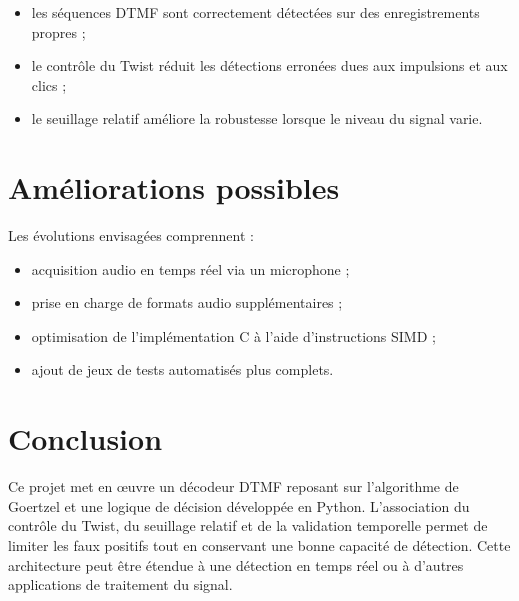 \documentclass[12pt,a4paper]{article}
\begin{document}
\begin{itemize}

\item les séquences DTMF sont correctement détectées sur des enregistrements propres ;

\item le contrôle du Twist réduit les détections erronées dues aux impulsions et aux clics ;

\item le seuillage relatif améliore la robustesse lorsque le niveau du signal varie.

\end{itemize}

\section{Améliorations possibles}

Les évolutions envisagées comprennent :

\begin{itemize}

\item acquisition audio en temps réel via un microphone ;

\item prise en charge de formats audio supplémentaires ;

\item optimisation de l'implémentation C à l'aide d'instructions SIMD ;

\item ajout de jeux de tests automatisés plus complets.

\end{itemize}

\section{Conclusion}

Ce projet met en œuvre un décodeur DTMF reposant sur l'algorithme de Goertzel et une logique de décision développée en Python. L'association du contrôle du Twist, du seuillage relatif et de la validation temporelle permet de limiter les faux positifs tout en conservant une bonne capacité de détection. Cette architecture peut être étendue à une détection en temps réel ou à d'autres applications de traitement du signal.
\end{document}
